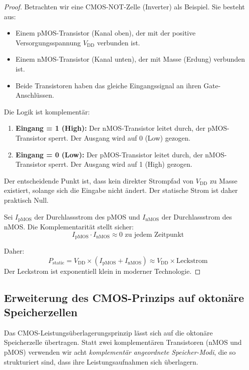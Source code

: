 \documentclass[12pt, a4paper]{article}
\theoremstyle{definition}
\theoremstyle{remark}
\begin{document}
\begin{proof}
Betrachten wir eine CMOS-NOT-Zelle (Inverter) als Beispiel. Sie besteht aus:
\begin{itemize}
  \item Einem pMOS-Transistor (Kanal oben), der mit der positive Versorgungsspannung $V_{\mathrm{DD}}$ verbunden ist.
  \item Einem nMOS-Transistor (Kanal unten), der mit Masse (Erdung) verbunden ist.
  \item Beide Transistoren haben das gleiche Eingangssignal an ihren Gate-Anschlüssen.
\end{itemize}

Die Logik ist komplementär:
\begin{enumerate}[label=(\alph*)]
  \item \textbf{Eingang = 1 (High):} Der nMOS-Transistor leitet durch, der pMOS-Transistor sperrt. Der Ausgang wird auf 0 (Low) gezogen.
  \item \textbf{Eingang = 0 (Low):} Der pMOS-Transistor leitet durch, der nMOS-Transistor sperrt. Der Ausgang wird auf 1 (High) gezogen.
\end{enumerate}

Der entscheidende Punkt ist, dass kein direkter Strompfad von $V_{\mathrm{DD}}$ zu Masse existiert, solange sich die Eingabe nicht ändert. Der statische Strom ist daher praktisch Null.

Sei $I_{\mathrm{pMOS}}$ der Durchlassstrom des pMOS und $I_{\mathrm{nMOS}}$ der Durchlassstrom des nMOS. Die Komplementarität stellt sicher:
\[
I_{\mathrm{pMOS}} \cdot I_{\mathrm{nMOS}} \approx 0 \text{ zu jedem Zeitpunkt}
\]

Daher:
\[
P_{\mathrm{static}} = V_{\mathrm{DD}} \times (I_{\mathrm{pMOS}} + I_{\mathrm{nMOS}}) \approx V_{\mathrm{DD}} \times \text{Leckstrom}
\]
Der Leckstrom ist exponentiell klein in moderner Technologie.
\end{proof}

\subsection{Erweiterung des CMOS-Prinzips auf oktonäre Speicherzellen}
\label{subsec:cmos_oktonaer_erweiterung}

Das CMOS-Leistungsüberlagerungsprinzip lässt sich auf die oktonäre Speicherzelle übertragen. Statt zwei komplementären Transistoren (nMOS und pMOS) verwenden wir acht \textit{komplementär angeordnete Speicher-Modi}, die so strukturiert sind, dass ihre Leistungsaufnahmen sich überlagern.
\end{document}
